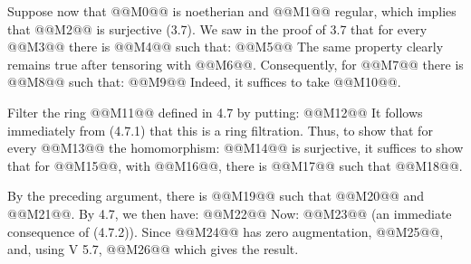 Suppose now that @@M0@@ is noetherian and @@M1@@ regular, which implies that @@M2@@ is surjective (3.7). We saw in the proof of 3.7 that for every @@M3@@ there is @@M4@@ such that:
@@M5@@
The same property clearly remains true after tensoring with @@M6@@. Consequently, for @@M7@@ there is @@M8@@ such that:
@@M9@@
Indeed, it suffices to take @@M10@@.

Filter the ring @@M11@@ defined in 4.7 by putting:
@@M12@@
It follows immediately from (4.7.1) that this is a ring filtration. Thus, to show that for every @@M13@@ the homomorphism:
@@M14@@
is surjective, it suffices to show that for @@M15@@, with @@M16@@, there is @@M17@@ such that @@M18@@.

By the preceding argument, there is @@M19@@ such that @@M20@@ and @@M21@@. By 4.7, we then have:
@@M22@@
Now:
@@M23@@
(an immediate consequence of (4.7.2)). Since @@M24@@ has zero augmentation, @@M25@@, and, using V 5.7,
@@M26@@
which gives the result.
